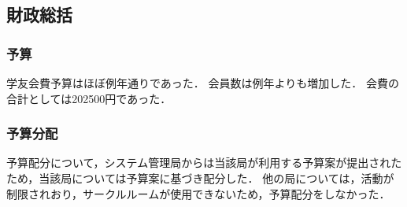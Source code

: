 \subsection*{財政総括}


\subsubsection*{予算}
学友会費予算はほぼ例年通りであった．
会員数は例年よりも増加した． 
会費の合計としては202500円であった．

\subsubsection*{予算分配}
予算配分について，システム管理局からは当該局が利用する予算案が提出されたため，当該局については予算案に基づき配分した．
他の局については，活動が制限されおり，サークルルームが使用できないため，予算配分をしなかった．

